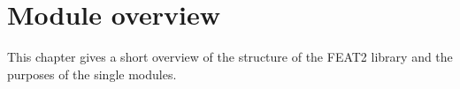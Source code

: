 \chapter{Module overview}

\newpage


This chapter gives a short overview of the structure of the
FEAT2 library and the purposes of the single modules. %

